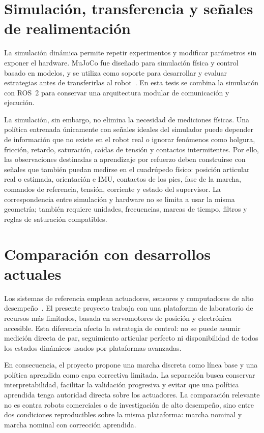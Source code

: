 \section{Simulación, transferencia y señales de realimentación}

La simulación dinámica permite repetir experimentos y modificar parámetros sin
exponer el hardware. MuJoCo fue diseñado para simulación física y control
basado en modelos, y se utiliza como soporte para desarrollar y evaluar
estrategias antes de transferirlas al robot~\cite{todorov2012mujoco,tassa2018controlsuite}.
En esta tesis se combina la simulación con ROS~2 para conservar una
arquitectura modular de comunicación y ejecución.

La simulación, sin embargo, no elimina la necesidad de mediciones físicas. Una
política entrenada únicamente con señales ideales del simulador puede depender
de información que no existe en el robot real o ignorar fenómenos como holgura,
fricción, retardo, saturación, caídas de tensión y contactos intermitentes. Por
ello, las observaciones destinadas a aprendizaje por refuerzo deben construirse
con señales que también puedan medirse en el cuadrúpedo físico: posición
articular real o estimada, orientación e IMU, contactos de los pies, fase de la
marcha, comandos de referencia, tensión, corriente y estado del supervisor. La
correspondencia entre simulación y hardware no se limita a usar la misma
geometría; también requiere unidades, frecuencias, marcas de tiempo, filtros y
reglas de saturación compatibles.

\section{Comparación con desarrollos actuales}

Los sistemas de referencia emplean actuadores, sensores y computadores de alto
desempeño~\cite{bledt2018cheetah3,hutter2016anymal}. El presente proyecto
trabaja con una plataforma de laboratorio de recursos más limitados, basada en
servomotores de posición y electrónica accesible. Esta diferencia afecta la
estrategia de control: no se puede asumir medición directa de par, seguimiento
articular perfecto ni disponibilidad de todos los estados dinámicos usados por
plataformas avanzadas.

En consecuencia, el proyecto propone una marcha discreta como línea base y una
política aprendida como capa correctiva limitada. La separación busca conservar
interpretabilidad, facilitar la validación progresiva y evitar que una política
aprendida tenga autoridad directa sobre los actuadores. La comparación relevante
no es contra robots comerciales o de investigación de alto desempeño, sino
entre dos condiciones reproducibles sobre la misma plataforma: marcha nominal y
marcha nominal con corrección aprendida.

